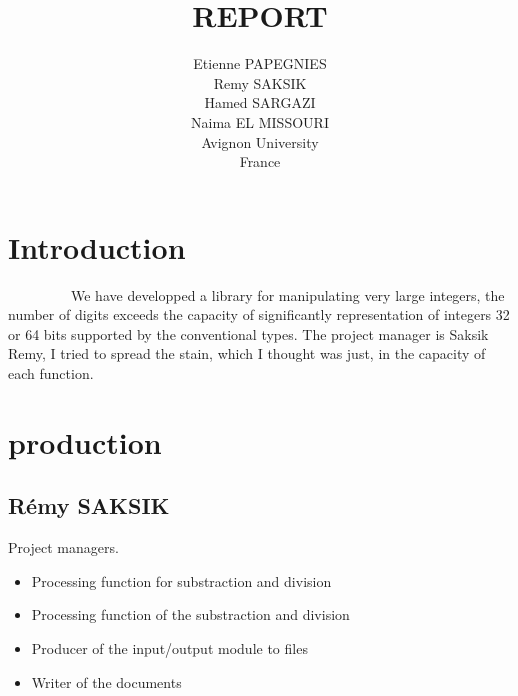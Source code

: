 \documentclass[11pt]{report}
\begin{document}
    \title{REPORT}
    \author { 
    Etienne PAPEGNIES\\
    Remy SAKSIK\\
    Hamed SARGAZI\\
    Naima EL MISSOURI\\
    Avignon University\\
    France\\
}
   \maketitle

\setcounter{secnumdepth}{1}



    \tableofcontents
    
   \chapter*{Introduction}  
   
~~~~~~~~~We have developped a library for manipulating very large integers, the number of digits exceeds the capacity of significantly
representation of integers 32 or 64 bits supported by the conventional types.
The project manager is Saksik Remy, I tried to spread the stain, which I thought was just, in the capacity of each function.
   
    \chapter*{production}  
   \section{R\'{e}my SAKSIK}

   Project managers.
        \begin{itemize}
            \item Processing function for substraction and division
            \item Processing function of the substraction and division
            \item Producer of the input/output module to files
            \item Writer of the documents
        \end{itemize}
\end{document}
